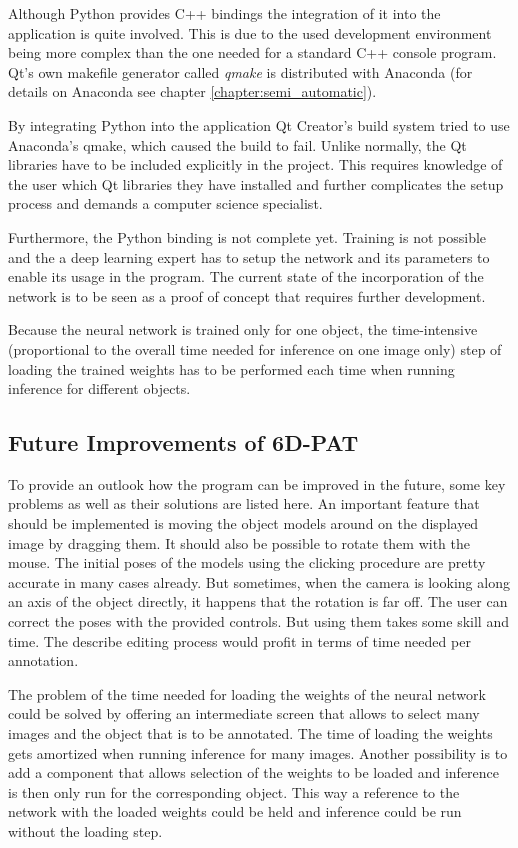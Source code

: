 Although Python provides C++ bindings the integration of it into the application is quite involved. This is due to the used development environment being more complex than the one needed for a standard C++ console program. Qt's own makefile generator called \textit{qmake} is distributed with Anaconda (for details on Anaconda see chapter \ref{chapter:semi_automatic}). 

By integrating Python into the application Qt Creator's build system tried to use Anaconda's qmake, which caused the build to fail. Unlike normally, the Qt libraries have to be included explicitly in the project. This requires knowledge of the user which Qt libraries they have installed and further complicates the setup process and demands a computer science specialist. 

Furthermore, the Python binding is not complete yet. Training is not possible and the a deep learning expert has to setup the network and its parameters to enable its usage in the program. The current state of the incorporation of the network is to be seen as a proof of concept that requires further development.

Because the neural network is trained only for one object, the time-intensive (proportional to the overall time needed for inference on one image only) step of loading the trained weights has to be performed each time when running inference for different objects.

\subsection{Future Improvements of 6D-PAT}

To provide an outlook how the program can be improved in the future, some key problems as well as their solutions are listed here. An important feature that should be implemented is moving the object models around on the displayed image by dragging them. It should also be possible to rotate them with the mouse. The initial poses of the models using the clicking procedure are pretty accurate in many cases already. But sometimes, when the camera is looking along an axis of the object directly, it happens that the rotation is far off. The user can correct the poses with the provided controls. But using them takes some skill and time. The describe editing process would profit in terms of time needed per annotation. 

The problem of the time needed for loading the weights of the neural network could be solved by offering an intermediate screen that allows to select many images and the object that is to be annotated. The time of loading the weights gets amortized when running inference for many images. Another possibility is to add a component that allows selection of the weights to be loaded and inference is then only run for the corresponding object. This way a reference to the network with the loaded weights could be held and inference could be run without the loading step.

